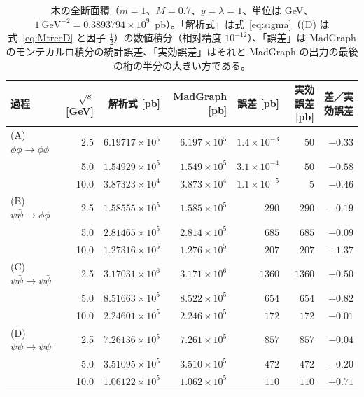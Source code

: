 \documentclass[a4paper,10pt]{ltjsarticle}
\begin{document}
\begin{table}[tbp]
\centering\small
\caption{木の全断面積（$m=1$、$M=0.7$、$y=\lambda=1$、単位は GeV、$1~\mathrm{GeV}^{-2}=0.3893794\times10^{9}$~pb）。「解析式」は式~\eqref{eq:sigma}（(D) は式~\eqref{eq:MtreeD} と因子 $\frac12$）の数値積分（相対精度 $10^{-12}$）、「誤差」は MadGraph のモンテカルロ積分の統計誤差、「実効誤差」はそれと MadGraph の出力の最後の桁の半分の大きい方である。}
\label{tab:tree}
\begin{tabular}{lrrrrrr}
\toprule
過程 & $\sqrt{s}$ [GeV] & 解析式 [pb] & MadGraph [pb] & 誤差 [pb] & 実効誤差 [pb] & 差／実効誤差 \\
\midrule
(A) $\phi\phi\to\phi\phi$ & 2.5 & $6.19717\times10^{5}$ & $6.197\times10^{5}$ & $1.4\times10^{-3}$ & $50$ & $-0.33$ \\
 & 5.0 & $1.54929\times10^{5}$ & $1.549\times10^{5}$ & $3.1\times10^{-4}$ & $50$ & $-0.58$ \\
 & 10.0 & $3.87323\times10^{4}$ & $3.873\times10^{4}$ & $1.1\times10^{-5}$ & $5$ & $-0.46$ \\
(B) $\psi\bar\psi\to\phi\phi$ & 2.5 & $1.58555\times10^{5}$ & $1.585\times10^{5}$ & $290$ & $290$ & $-0.19$ \\
 & 5.0 & $2.81465\times10^{5}$ & $2.814\times10^{5}$ & $685$ & $685$ & $-0.09$ \\
 & 10.0 & $1.27316\times10^{5}$ & $1.276\times10^{5}$ & $207$ & $207$ & $+1.37$ \\
(C) $\psi\bar\psi\to\psi\bar\psi$ & 2.5 & $3.17031\times10^{6}$ & $3.171\times10^{6}$ & $1360$ & $1360$ & $+0.50$ \\
 & 5.0 & $8.51663\times10^{5}$ & $8.522\times10^{5}$ & $654$ & $654$ & $+0.82$ \\
 & 10.0 & $2.24601\times10^{5}$ & $2.246\times10^{5}$ & $172$ & $172$ & $-0.01$ \\
(D) $\psi\psi\to\psi\psi$ & 2.5 & $7.26136\times10^{5}$ & $7.261\times10^{5}$ & $857$ & $857$ & $-0.04$ \\
 & 5.0 & $3.51095\times10^{5}$ & $3.510\times10^{5}$ & $472$ & $472$ & $-0.20$ \\
 & 10.0 & $1.06122\times10^{5}$ & $1.062\times10^{5}$ & $110$ & $110$ & $+0.71$ \\
\bottomrule
\end{tabular}
\end{table}
\end{document}
